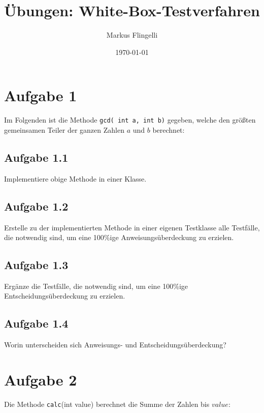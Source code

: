 

\title{Übungen: White-Box-Testverfahren}
\author{Markus Flingelli}
\date{\today}


\maketitle

\section*{Aufgabe 1}
Im Folgenden ist die Methode \lstinline{gcd( int a, int b)} gegeben, welche den größten gemeinsamen Teiler der ganzen Zahlen $a$ und $b$ berechnet:



\subsection*{Aufgabe 1.1}

Implementiere obige Methode in einer Klasse.

\subsection*{Aufgabe 1.2}

Erstelle zu der implementierten Methode in einer eigenen Testklasse alle Testfälle, die notwendig sind, um eine 100\%ige Anweisungsüberdeckung zu erzielen.

\subsection*{Aufgabe 1.3}

Ergänze die Testfälle, die notwendig sind, um eine 100\%ige Entscheidungsüberdeckung zu erzielen.

\subsection*{Aufgabe 1.4}

Worin unterscheiden sich Anweisungs- und Entscheidungsüberdeckung? 

\newpage
\section*{Aufgabe 2}
Die Methode \lstinline{calc}(int value) berechnet die Summe der Zahlen bis $value$:



